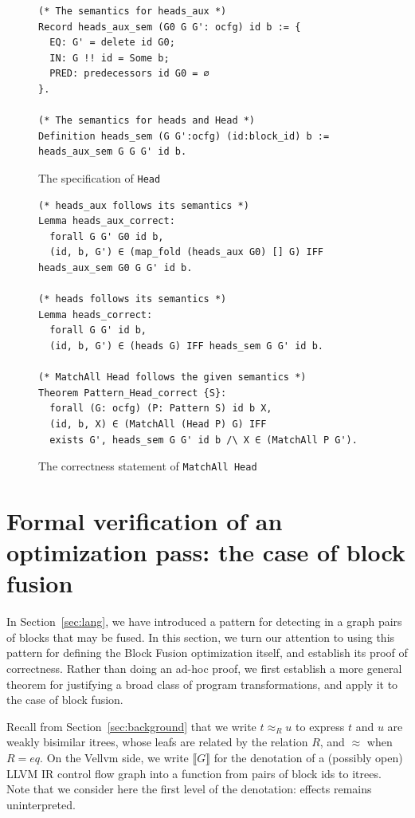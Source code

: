 \documentclass[11pt]{article}
\newcommand{\inlinecoq}[1]{\mbox{\lstinline[style=customcoq,columns=fixed,basewidth=.48em]{#1}}}
\newcommand{\ilc}[1]{\inlinecoq{#1}}
\begin{document}
\begin{figure}[h]
  \begin{lstlisting}[style=customcoq,basicstyle=\small\ttfamily]
(* The semantics for heads_aux *)
Record heads_aux_sem (G0 G G': ocfg) id b := {
  EQ: G' = delete id G0;
  IN: G !! id = Some b;
  PRED: predecessors id G0 = ∅
}.

(* The semantics for heads and Head *)
Definition heads_sem (G G':ocfg) (id:block_id) b := heads_aux_sem G G G' id b.
  \end{lstlisting}
  \caption{The specification of \ilc{Head}}
  \label{fig:sem_head_def}
  \vspace{1em}
  \begin{lstlisting}[style=customcoq,basicstyle=\small\ttfamily]
(* heads_aux follows its semantics *)
Lemma heads_aux_correct:
  forall G G' G0 id b,
  (id, b, G') ∈ (map_fold (heads_aux G0) [] G) IFF heads_aux_sem G0 G G' id b.

(* heads follows its semantics *)
Lemma heads_correct:
  forall G G' id b,
  (id, b, G') ∈ (heads G) IFF heads_sem G G' id b.

(* MatchAll Head follows the given semantics *)
Theorem Pattern_Head_correct {S}:
  forall (G: ocfg) (P: Pattern S) id b X,
  (id, b, X) ∈ (MatchAll (Head P) G) IFF
  exists G', heads_sem G G' id b /\ X ∈ (MatchAll P G').
  \end{lstlisting}
  \caption{The correctness statement of \ilc{MatchAll Head}}
  \label{fig:head_cor}
\end{figure}

\section{Formal verification of an optimization pass: the case of block fusion}
\label{sec:deno}

In Section~\ref{sec:lang}, we have introduced a pattern for detecting in a graph pairs of blocks that may be fused. In this section, we turn our attention to using this pattern for defining the Block Fusion optimization itself, and establish its proof of correctness. Rather than doing an ad-hoc proof, we first establish a more general theorem for justifying a broad class of program transformations, and apply it to the case of block fusion.

Recall from Section~\ref{sec:background} that we write $t \approx_R u$ to express $t$ and $u$ are weakly bisimilar itrees, whose leafs are related by the relation $R$, and $\approx$ when $R=eq$. On the Vellvm side, we write $\llbracket G \rrbracket$ for the denotation of a (possibly open) LLVM IR control flow graph into a function from pairs of block ids to itrees. Note that we consider here the first level of the denotation: effects remains uninterpreted.
\end{document}
